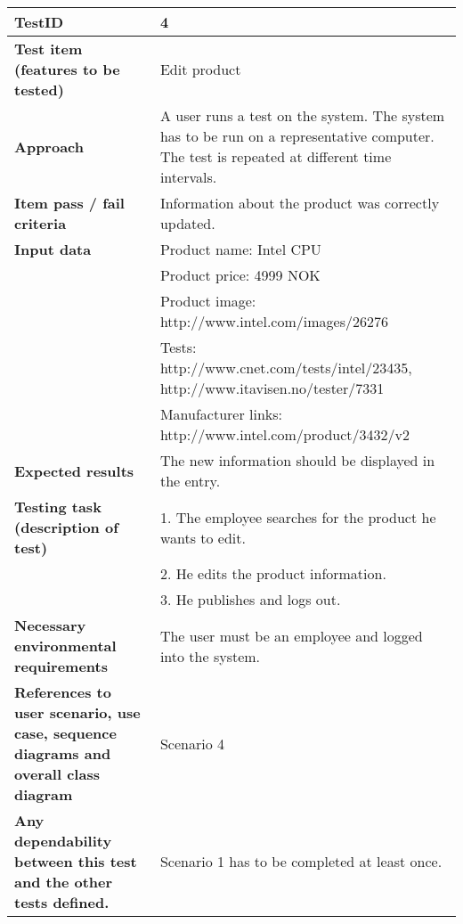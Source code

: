 \begin{table}
    \centering
	\begin{tabularx}{1.2\textwidth}{| p{5cm} | X |}
	\hline
	\textbf{TestID} 																& 4\\ \hline
	\textbf{Test item (features to be tested)} 											& Edit product\\ \hline
	\textbf{Approach} 															& A user runs a test on the system. The system has to be run on a representative computer. 
																			The test is repeated at different time intervals.\\ \hline
	\textbf{Item pass / fail criteria} 													& Information about the product was correctly updated.\\ \hline
	\textbf{Input data} 															& Product name: Intel CPU\\
																			& Product price: 4999 NOK\\ 
																			& Product image: http://www.intel.com/images/26276\\ 
																			& Tests: {http://www.cnet.com/tests/intel/23435, http://www.itavisen.no/tester/7331} \\ 
																			& Manufacturer links: {http://www.intel.com/product/3432/v2}\\ \hline
	\textbf{Expected results}									 					& The new information should be displayed in the entry.\\ \hline
	\textbf{Testing task (description of test)} 											& 1. The employee searches for the product he wants to edit. \\
																			& 2. He edits the product information. \\
																			& 3. He publishes and logs out. \\ \hline
	\textbf{Necessary environmental requirements} 										& The user must be an employee and logged into the system.\\ \hline
	\textbf{References to user scenario, use case, sequence diagrams and overall class diagram} 		& Scenario 4\\ \hline
	\textbf{Any dependability between this test and the other tests defined.}		 				& Scenario 1 has to be completed at least once.\\ \hline
	\end{tabularx}
\end{table}


